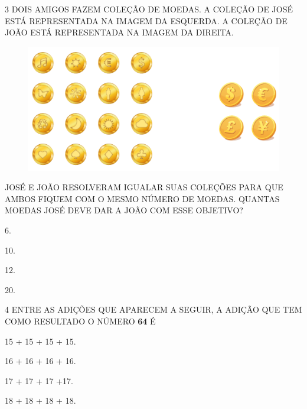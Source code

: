 \pagebreak
\num{3} DOIS AMIGOS FAZEM COLEÇÃO DE MOEDAS. A COLEÇÃO DE JOSÉ ESTÁ REPRESENTADA NA IMAGEM DA
ESQUERDA. A COLEÇÃO DE JOÃO ESTÁ REPRESENTADA NA IMAGEM DA DIREITA.


\begin{figure}[H]
\includegraphics[width=\textwidth]{./media/SAEB_1ANO_MAT_FIGURA121.png}
\end{figure}

JOSÉ E JOÃO RESOLVERAM IGUALAR SUAS COLEÇÕES PARA QUE AMBOS FIQUEM COM O MESMO NÚMERO DE MOEDAS. QUANTAS MOEDAS JOSÉ DEVE DAR A JOÃO COM ESSE OBJETIVO?

\begin{multicols}{2}
\begin{escolha}%
\item 6.

\item 10.

\item 12.

\item 20.
\end{escolha}
\end{multicols}

\num{4} ENTRE AS ADIÇÕES QUE APARECEM A SEGUIR, A ADIÇÃO QUE 
TEM COMO RESULTADO O NÚMERO \textbf{64} É

\begin{escolha}[itemsep=0pt]
\item 15 + 15 + 15 + 15.

\item 16 + 16 + 16 + 16.

\item 17 + 17 + 17 +17.

\item 18 + 18 + 18 + 18.
\end{escolha}

